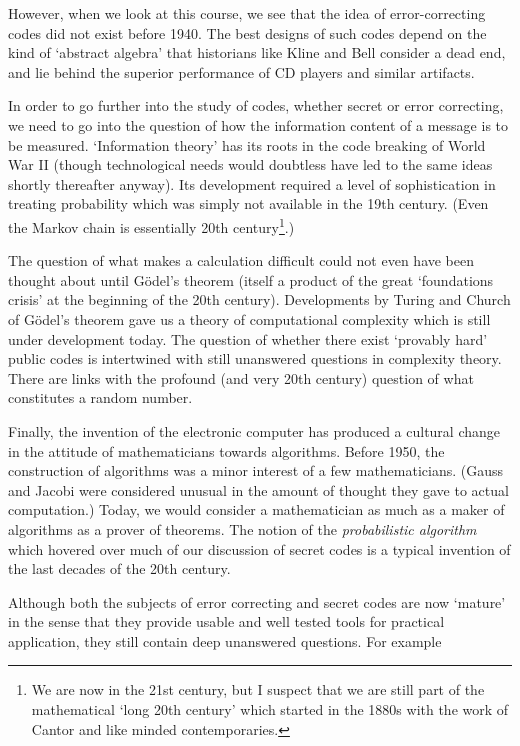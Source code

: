However, when we look at this course, we
see that the idea of error-correcting codes
did not exist before 1940. The best
designs of such codes  depend on the kind
of `abstract algebra' that historians
like Kline and Bell  consider a dead end,
and lie behind the superior
performance of  CD players and
similar artifacts.

In order to go further into the study of codes, whether
secret or error correcting, we need to go
into the question of  how the information
content of a message is to be measured.
`Information theory' has its roots in the
code breaking of World War II (though
technological needs would doubtless
have led to the same ideas shortly
thereafter anyway). Its development
required a level of sophistication
in treating probability which was simply
not available in the 19th century.
(Even the Markov chain is essentially 20th
century\footnote{We are now in the 21st century,
but I suspect that we are still part
of the mathematical `long 20th century'
which started in the 1880s with the work of Cantor
and like minded contemporaries.}.)

The question of what makes a calculation difficult
could not even have been thought about until
G\"{o}del's theorem (itself a product of
the great `foundations crisis' at the beginning
of the 20th century). Developments by
Turing and Church of G\"{o}del's theorem
gave us a theory of computational complexity
which is still under development today.
The question of whether there exist
`provably hard' public codes is intertwined
with still unanswered questions in complexity
theory. There are links with the profound
(and very 20th century) question of what
constitutes a random number.

Finally, the invention of the electronic computer
has produced a cultural change in the attitude
of mathematicians towards algorithms. Before 1950,
the construction of algorithms was a minor interest
of a few mathematicians. (Gauss and Jacobi were
considered unusual in the amount of thought they
gave to actual computation.) Today, we would consider
a mathematician
as much as a maker of algorithms as a prover of theorems.
The notion of the \emph{probabilistic algorithm}
which hovered over much of our discussion of
secret codes is a typical invention of the last
decades of the 20th century.

Although both the subjects of error correcting and   
secret codes are now `mature' in the
sense that they provide usable  and well tested
tools for practical application, they still
contain deep unanswered questions. For example


